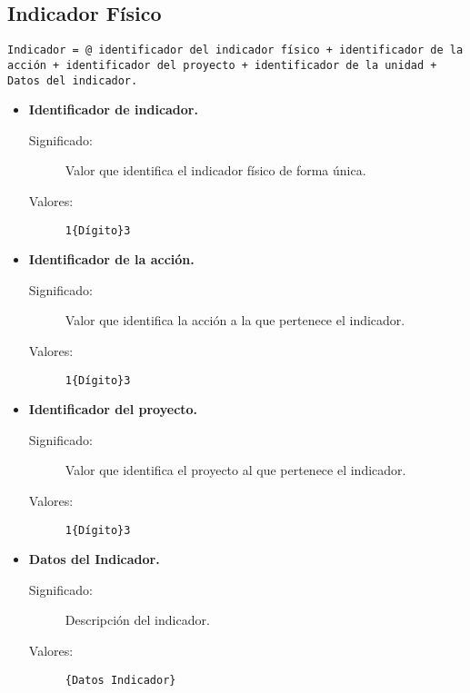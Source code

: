 \subsection{Indicador Físico}
\label{dd:Indicador}
\begin{lstlisting}
Indicador = @ identificador del indicador físico + identificador de la acción + identificador del proyecto + identificador de la unidad + Datos del indicador. 
\end{lstlisting}
  \begin{itemize}
    \item \textbf{Identificador de indicador.}
      \begin{description}
        \item [Significado:] Valor que identifica el indicador físico de forma única.
        \item [Valores:]{\begin{lstlisting}
1{Dígito}3\end{lstlisting}}\end{description}

    \item \textbf{Identificador de la acción.}
      \begin{description}
        \item [Significado:] Valor que identifica la acción a la que pertenece el indicador.
        \item [Valores:]{\begin{lstlisting}
1{Dígito}3\end{lstlisting}}\end{description}

    \item \textbf{Identificador del proyecto.}
      \begin{description}
        \item [Significado:] Valor que identifica el proyecto al que pertenece el indicador.
        \item [Valores:]{\begin{lstlisting}
1{Dígito}3\end{lstlisting}}\end{description}

    \item \textbf{Datos del Indicador.}
      \begin{description}
        \item [Significado:] Descripción del indicador.
        \item [Valores:]{\begin{lstlisting}
{Datos Indicador}\end{lstlisting}}\end{description}
\end{itemize}


